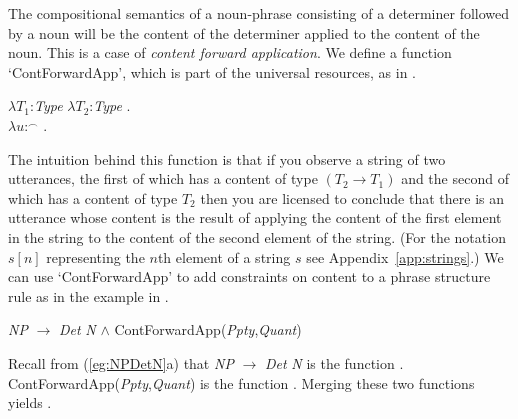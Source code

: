 The compositional semantics of a noun-phrase consisting of a
determiner followed by a noun will be the content of the determiner
applied to the content of the noun.  This is a case of \textit{content
  forward application}.  We define a function `ContForwardApp', which is
part of the universal resources, as in \nexteg{}.
\begin{ex} 
$\lambda T_1$:\textit{Type} $\lambda T_2$:\textit{Type} . \\
\hspace*{1em}$\lambda
u$:$^{\frown}$ . \\
\hspace*{2em} 
\end{ex} 
The intuition behind this function is that if you observe a string of
two utterances, the first of which has a content of type
$(T_2\rightarrow T_1)$ and the second of which has a content of type
$T_2$ then you are licensed to conclude that there is an utterance
whose content is the result of applying the content of the first
element in the string to the content of the second element of the
string. (For the notation $s[n]$ representing the $n$th element of a
string $s$ see Appendix~\ref{app:strings}.)  We can use
`ContForwardApp' to add constraints on content to a phrase structure
rule as in the example in \nexteg{}.
\begin{ex} 
\textit{NP} $\longrightarrow$ \textit{Det} \textit{N} \d{\d{$\wedge$}} ContForwardApp(\textit{Ppty},\textit{Quant}) 
\end{ex} 
Recall from (\ref{eg:NPDetN}a) that  \textit{NP} $\longrightarrow$
\textit{Det} \textit{N} is the function
. ContForwardApp(\textit{Ppty},\textit{Quant}) is the
function .  Merging these two functions yields .
